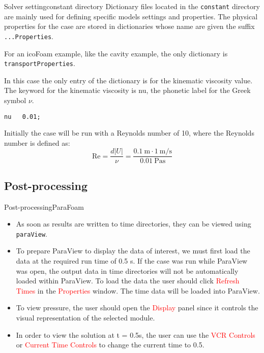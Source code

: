 \documentclass{beamer}
\begin{document}
\begin{frame}[fragile]{Solver setting}{constant directory}
Dictionary files located in the \texttt{constant} directory are mainly used for defining specific models settings and properties. The physical properties for the case are stored in dictionaries whose name are given the suffix \texttt{...Properties}. 

For an icoFoam example, like the cavity example, the only dictionary is \texttt{transportProperties}.

In this case the only entry of the dictionary is for the kinematic viscosity value. The keyword for the kinematic viscosity is nu, the phonetic label for the Greek symbol $\nu$.
\begin{small}
\begin{verbatim}
nu   0.01;
\end{verbatim}
\end{small}


Initially the case will be run with a Reynolds number of 10, where the Reynolds number is defined as: 
\[
  \mathrm{Re} = \frac{d|U|}{\nu} = \frac{\SI{0.1}{\metre}\cdot\SI{1}{\metre\per\second}}{\SI{0.01}{\pascal\second}}
\]


\end{frame}

\subsection{Post-processing}

\begin{frame}{Post-processing}{ParaFoam}
\begin{itemize}
\item As soon as results are written to time directories, they can be viewed using \texttt{paraView}.
\item To prepare ParaView to display the data of interest, we must
  first load the data at the required run time of 0.5 s. If the case
  was run while ParaView was open, the output data in time directories
  will not be automatically loaded within ParaView. To load the data
  the user should click \textcolor{red}{Refresh Times} in the
  \textcolor{red}{Properties} window. The time data will be loaded
  into ParaView. 
\item To view pressure, the user should open the
  \textcolor{red}{Display} panel since it controls the visual
  representation of the selected module. 
\item In order to view the solution at t = 0.5s, the user can use the
  \textcolor{red}{VCR Controls} or \textcolor{red}{Current Time
    Controls} to change the current time to 0.5. 
\end{itemize}


\end{frame}
\end{document}
